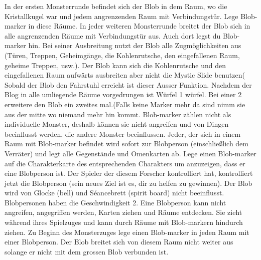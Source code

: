   \begin{itemize}
    \bitem In der ersten Monsterrunde befindet sich der Blob in dem Raum, wo die Kristallkugel war und jedem angrenzenden Raum mit Verbindungstür. Lege Blob-marker in diese Räume. In jeder weiteren Monsterrunde breitet der Blob sich in alle angrenzenden Räume mit Verbindungstür aus. Auch dort legst du Blob-marker hin. Bei seiner Ausbreitung nutzt der Blob alle Zugmöglichkeiten aus (Türen, Treppen, Geheimgänge, die Kohlenrutsche, den eingefallenen Raum, geheime Treppen, usw.). Der Blob kann sich die Kohlenrutsche und den eingefallenen Raum aufwärts ausbreiten aber nicht die Mystic Slide benutzen(
    \bitem Sobald der Blob den Fahrstuhl erreicht ist dieser Ausser Funktion.
    \newpage
    \bitem Nachdem der Blog in alle umliegende Räume vorgedrungen ist Würfel 1 würfel. Bei einer 2 erweitere den Blob ein zweites mal.(Falls keine Marker mehr da sind nimm sie aus der mitte wo niemand mehr hin kommt.
    \bitem Blob-marker zählen nicht als individuelle Monster, deshalb können sie nicht angreifen und von Dingen beeinflusst werden, die andere Monster beeinflussen.
    \bitem Jeder, der sich in einem Raum mit Blob-marker befindet wird sofort zur Blobperson (einschließlich dem Verräter) und legt alle Gegenstände und Omenkarten ab. Lege einen Blob-marker auf die Charakterkarte des entsprechenden Charakters um anzuzeigen, dass er eine Blobperson ist.
    \bitem Der Spieler der diesem Forscher kontrolliert hat, kontrolliert jetzt die Blobperson (sein neues Ziel ist es, dir zu helfen zu gewinnen).
    \bitem Der Blob wird von Glocke (bell) und Séancebrett (spirit board) nicht beeinflusst.
    \bitem Blobpersonen haben die Geschwindigkeit 2.
    \bitem Eine Blobperson kann nicht angreifen, angegriffen werden, Karten ziehen und Räume entdecken. Sie zieht während ihres Spielzuges und kann durch Räume mit Blob-markern hindurch ziehen.
    \bitem Zu Beginn des Monsterzuges lege einen Blob-marker in jeden Raum mit einer Blobperson. Der Blob breitet sich von diesem Raum nicht weiter aus solange er nicht mit dem grossen Blob verbunden ist.
    \end{itemize}



